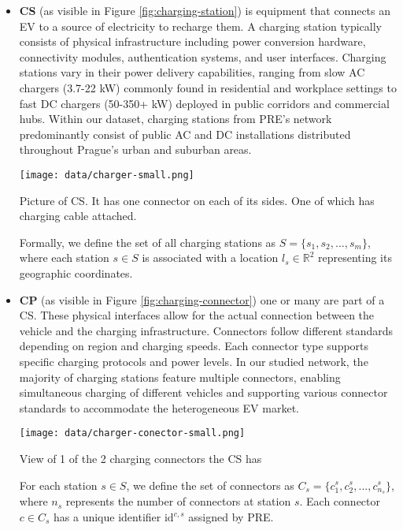 \begin{itemize}
    \setlength\itemsep{1em}
    \item \textbf{\acrlong{CS}} (as visible in Figure \ref{fig:charging-station}) is equipment that connects an \acrshort{EV} to a source of electricity to recharge them. A charging station typically consists of physical infrastructure including power conversion hardware, connectivity modules, authentication systems, and user interfaces. Charging stations vary in their power delivery capabilities, ranging from slow AC chargers (3.7-22 kW) commonly found in residential and workplace settings to fast DC chargers (50-350+ kW) deployed in public corridors and commercial hubs. Within our dataset, charging stations from PRE's network predominantly consist of public AC and DC installations distributed throughout Prague's urban and suburban areas.

          \begin{marginfigure}
              \centering
              \texttt{[image: data/charger-small.png]}
              \caption{Picture of \acrlong{CS}. It has one connector on each of its sides. One of which has charging cable attached.}
              \label{fig:charging-station}
          \end{marginfigure}
          \vspace{3.5mm}
          Formally, we define the set of all charging stations as $S = \{s_1, s_2, ..., s_m\}$, where each station $s \in S$ is associated with a location $l_s \in \mathbb{R}^2$ representing its geographic coordinates.

    \item  \textbf{\acrlong{CP}} (as visible in Figure \ref{fig:charging-connector}) one or many are part of a \acrshort{CS}. These physical interfaces allow for the actual connection between the vehicle and the charging infrastructure. Connectors follow different standards depending on region and charging speeds. Each connector type supports specific charging protocols and power levels. In our studied network, the majority of charging stations feature multiple connectors, enabling simultaneous charging of different vehicles and supporting various connector standards to accommodate the heterogeneous EV market.

          \begin{marginfigure}
              \centering
              \texttt{[image: data/charger-conector-small.png]}
              \caption{View of 1 of the 2 charging connectors the \acrshort{CS} has}
              \label{fig:charging-connector}
          \end{marginfigure}
          \vspace{3.5mm}
          For each station $s \in S$, we define the set of connectors as $C_s = \{c_1^s, c_2^s, ..., c_{n_s}^s\}$, where $n_s$ represents the number of connectors at station $s$. Each connector $c \in C_s$ has a unique identifier $\text{id}^{c,s}$ assigned by PRE.


\end{itemize}
